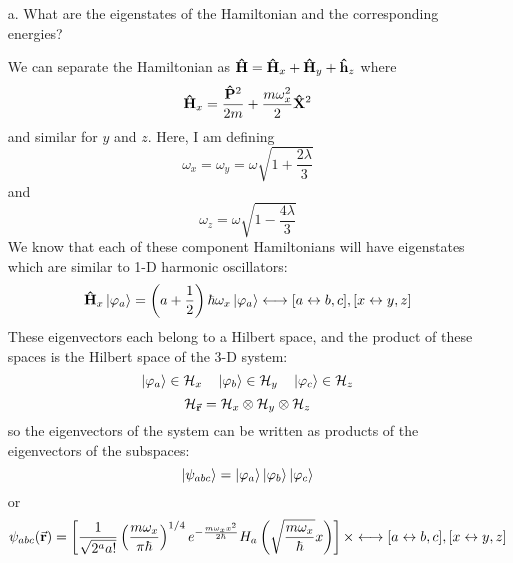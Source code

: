 \documentclass[a4paper,twoside]{article}
\begin{document}
\begin{itemize}
    \item[a.] What are the eigenstates of the Hamiltonian and the corresponding energies?
        \begin{problem}
            We can separate the Hamiltonian as $ \vu{H} = \vu{H}_x + \vu{H}_y + \vu{h}_z $ where
            \begin{equation}
                \vu{H}_x = \frac{ \vu{P}^2}{2m} + \frac{m \omega_x^2}{2} \vu{X}^2
            \end{equation}
            and similar for $ y $ and $ z $. Here, I am defining
            \begin{equation}
                \omega_x = \omega_y = \omega \sqrt{1 + \frac{2 \lambda}{3}}
            \end{equation}
            and
            \begin{equation}
                \omega_z = \omega \sqrt{1 - \frac{4 \lambda}{3}}
            \end{equation}
            We know that each of these component Hamiltonians will have eigenstates which are similar to 1-D harmonic oscillators:
            \begin{equation}
                \vu{H}_x\ket{\varphi_a} = \left( a + \frac{1}{2} \right) \hbar \omega_x\ket{\varphi_a} \longleftrightarrow [a \leftrightarrow b,c], [x \leftrightarrow y,z]
            \end{equation}
            These eigenvectors each belong to a Hilbert space, and the product of these spaces is the Hilbert space of the 3-D system:
            \begin{equation}
                \ket{\varphi_a} \in \mathcal{H}_x\quad\ket{\varphi_b} \in \mathcal{H}_y\quad\ket{\varphi_c} \in \mathcal{H}_z
            \end{equation}
            \begin{equation}
                \mathcal{H}_{ \va{r}} = \mathcal{H}_x \otimes \mathcal{H}_y \otimes \mathcal{H}_z
            \end{equation}
            so the eigenvectors of the system can be written as products of the eigenvectors of the subspaces:
            \begin{equation}
                \ket{\psi_{abc}} =\ket{\varphi_a}\ket{\varphi_b}\ket{\varphi_c}
            \end{equation}
            or
            \begin{equation}
                \psi_{abc}( \va{r}) = \left[ \frac{1}{\sqrt{2^a a!}} \left( \frac{m \omega_x}{\pi \hbar} \right)^{1/4} e^{- \frac{m \omega_x x^2}{2 \hbar}} H_a\left( \sqrt{\frac{m \omega_x}{\hbar}} x \right) \right] \times \longleftrightarrow [a \leftrightarrow b,c], [x \leftrightarrow y,z]

\end{equation}
\end{problem}
\end{itemize}
\end{document}
